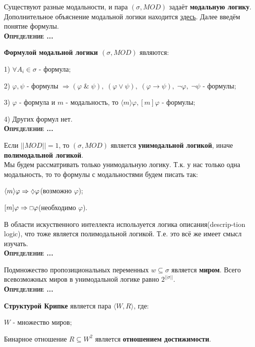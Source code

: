 \documentclass[18pt, a4paper]{extarticle}
\newcounter{par}
\newcounter{spar}
\newcounter{zap}
\newcommand{\opr}{\textbf{\textsc{Определение \thepar.\if\thespar1\thespar.\fi\thezap.\;}}\stepcounter{zap}}
\newcommand{\ampersand}{\;\&\;}
\newcommand{\vp}{\varphi}
\newcommand{\sg}{\sigma}
\newcommand{\modal}{M\!O\!D}
\newcommand{\may}{\scalebox{0.8}{$\diamondsuit$}}
\newcommand{\need}{\scalebox{0.75}{$\Box$}}
\begin{document}
Существуют разные модальности, и пара $(\sg,\modal)$ задаёт \textbf{модальную логику}.\\

Дополнительное объяснение модальной логики находится \href{https://ru.wikipedia.org/wiki/\%D0\%9C\%D0\%BE\%D0\%B4\%D0\%B0\%D0\%BB\%D1\%8C\%D0\%BD\%D0\%B0\%D1\%8F_\%D0\%BB\%D0\%BE\%D0\%B3\%D0\%B8\%D0\%BA\%D0\%B0}{\underline{здесь}}.
Далее введём понятие формулы.\\

\opr 

\textbf{Формулой модальной логики $(\sg,\modal)$} являются:

1) $\forall A_i\in\sg$ - формула;

2) $\vp,\psi$ - формулы $\Rightarrow(\vp\ampersand\psi),\;(\vp\vee\psi),\;(\vp\to\psi),\;\lnot\vp,\;\lnot\psi$ - формулы;

3) $\vp$ - формула и $m$ - модальность, то $\langle m\rangle\vp,[m]\vp$ - формулы;

4) Других формул нет.\\

\opr 

Если $||\modal||=1$, то $(\sg,\modal)$ является \textbf{унимодальной логикой}, иначе \textbf{полимодальной логикой}.\\

Мы будем рассматривать только унимодальную логику. Т.к. у нас только одна модальность, то то формулы с модальностями будем писать так:

$\langle m\rangle\vp\Rightarrow\may\vp$(возможно $\vp$);

$[m]\vp\Rightarrow\need\vp$(необходимо $\vp$).

В области искуственного интеллекта используется логика описания(descrip-\;\;\;\;tion logic), что тоже является полимодальной логикой. Т.е. это всё же имеет смысл изучать. \\

\opr

Подмножество пропозициональных переменных $w\subseteq\sg$ является \textbf{миром}.
Всего всевозможных миров в унимодальной логике равно $2^{||\sg||}$.\\

\opr 

\textbf{Структурой Крипке} является пара $\langle W,R\rangle$, где:

$W$ - множество миров;

Бинарное отношение $R\subseteq W^2$ является \textbf{отношением достижимости}.\\
\end{document}
